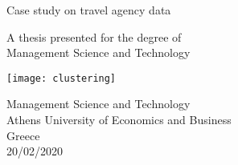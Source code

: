 \begin{titlepage}
    \begin{center}
        \vspace*{1cm}
 
        \Huge
 
        \vspace{0.5cm}
        \LARGE
        Case study on travel agency data
 
        \vspace{1.5cm}
 

	\vspace{2.5cm}
 
        A thesis presented for the degree of\\
        Management Science and Technology
 
        \vspace{0.8cm}

	\texttt{[image: clustering]}

	\vfill

        \Large
        Management Science and Technology\\
        Athens University of Economics and Business\\
        Greece\\
        20/02/2020

	\vspace{2.5cm}
 
    \end{center}
\end{titlepage}